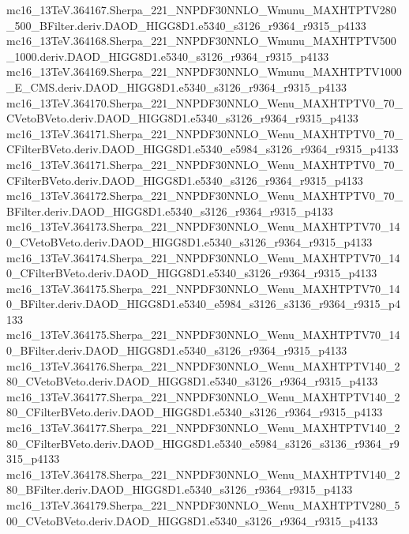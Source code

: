 mc16_13TeV.364167.Sherpa_221_NNPDF30NNLO_Wmunu_MAXHTPTV280_500_BFilter.deriv.DAOD_HIGG8D1.e5340_s3126_r9364_r9315_p4133 \\
mc16_13TeV.364168.Sherpa_221_NNPDF30NNLO_Wmunu_MAXHTPTV500_1000.deriv.DAOD_HIGG8D1.e5340_s3126_r9364_r9315_p4133 \\
mc16_13TeV.364169.Sherpa_221_NNPDF30NNLO_Wmunu_MAXHTPTV1000_E_CMS.deriv.DAOD_HIGG8D1.e5340_s3126_r9364_r9315_p4133 \\
mc16_13TeV.364170.Sherpa_221_NNPDF30NNLO_Wenu_MAXHTPTV0_70_CVetoBVeto.deriv.DAOD_HIGG8D1.e5340_s3126_r9364_r9315_p4133 \\
mc16_13TeV.364171.Sherpa_221_NNPDF30NNLO_Wenu_MAXHTPTV0_70_CFilterBVeto.deriv.DAOD_HIGG8D1.e5340_e5984_s3126_r9364_r9315_p4133 \\
mc16_13TeV.364171.Sherpa_221_NNPDF30NNLO_Wenu_MAXHTPTV0_70_CFilterBVeto.deriv.DAOD_HIGG8D1.e5340_s3126_r9364_r9315_p4133 \\
mc16_13TeV.364172.Sherpa_221_NNPDF30NNLO_Wenu_MAXHTPTV0_70_BFilter.deriv.DAOD_HIGG8D1.e5340_s3126_r9364_r9315_p4133 \\
mc16_13TeV.364173.Sherpa_221_NNPDF30NNLO_Wenu_MAXHTPTV70_140_CVetoBVeto.deriv.DAOD_HIGG8D1.e5340_s3126_r9364_r9315_p4133 \\
mc16_13TeV.364174.Sherpa_221_NNPDF30NNLO_Wenu_MAXHTPTV70_140_CFilterBVeto.deriv.DAOD_HIGG8D1.e5340_s3126_r9364_r9315_p4133 \\
mc16_13TeV.364175.Sherpa_221_NNPDF30NNLO_Wenu_MAXHTPTV70_140_BFilter.deriv.DAOD_HIGG8D1.e5340_e5984_s3126_s3136_r9364_r9315_p4133 \\
mc16_13TeV.364175.Sherpa_221_NNPDF30NNLO_Wenu_MAXHTPTV70_140_BFilter.deriv.DAOD_HIGG8D1.e5340_s3126_r9364_r9315_p4133 \\
mc16_13TeV.364176.Sherpa_221_NNPDF30NNLO_Wenu_MAXHTPTV140_280_CVetoBVeto.deriv.DAOD_HIGG8D1.e5340_s3126_r9364_r9315_p4133 \\
mc16_13TeV.364177.Sherpa_221_NNPDF30NNLO_Wenu_MAXHTPTV140_280_CFilterBVeto.deriv.DAOD_HIGG8D1.e5340_s3126_r9364_r9315_p4133 \\
mc16_13TeV.364177.Sherpa_221_NNPDF30NNLO_Wenu_MAXHTPTV140_280_CFilterBVeto.deriv.DAOD_HIGG8D1.e5340_e5984_s3126_s3136_r9364_r9315_p4133 \\
mc16_13TeV.364178.Sherpa_221_NNPDF30NNLO_Wenu_MAXHTPTV140_280_BFilter.deriv.DAOD_HIGG8D1.e5340_s3126_r9364_r9315_p4133 \\
mc16_13TeV.364179.Sherpa_221_NNPDF30NNLO_Wenu_MAXHTPTV280_500_CVetoBVeto.deriv.DAOD_HIGG8D1.e5340_s3126_r9364_r9315_p4133 \\
